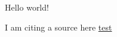 \documentclass[a4paper, 12pt]{article}
\newcommand{\customcite}[2]{%
  \begingroup
  \hypersetup{linkcolor=blue}%
  \hyperlink{cite.#2}{\color{blue}#1}
  \endgroup\unskip
}
\begin{document}
Hello world!

I am citing a source here \customcite{test}{test2025}

\printbibliography
\end{document}
